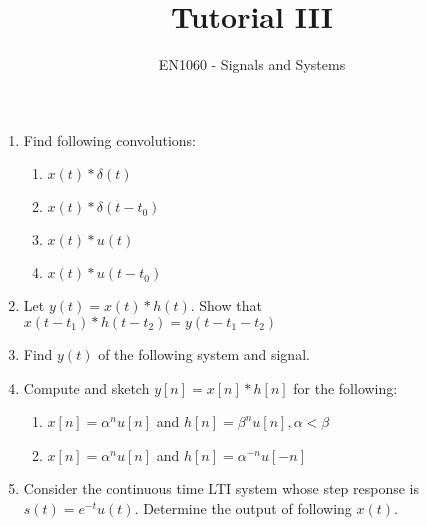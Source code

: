 \documentclass[12pt]{article}
\begin{document}


\title{Tutorial III}%
\author{EN1060 - Signals and Systems\\} %

\maketitle
\begin{enumerate}
\item Find following convolutions:
\begin{enumerate}
    \item $x(t)\ast\delta(t)$
    \item $x(t)\ast\delta(t-t_0)$
    \item $x(t)\ast u(t)$
    \item $x(t)\ast u(t-t_0)$
\end{enumerate}

\item Let $y(t) = x(t)\ast h(t)$. Show that $x(t-t_1)\ast h(t-t_2) = y(t-t_1-t_2)$

\item Find $y(t)$ of the following system and signal.

\begin{figure}[h]
    \centering
    
\caption{}
\end{figure}

\item Compute and sketch $y[n] = x[n]\ast h[n]$ for the following:

\begin{enumerate}
    \item $ x[n] = \alpha^{n}u[n]$ \hspace{1cm} and \hspace{1cm} $h[n] = \beta^{n}u[n] , \alpha < \beta$
    \item $x[n] = \alpha^{n}u[n]$  \hspace{1cm} and \hspace{1cm} $h[n] = \alpha^{-n}u[-n]$
\end{enumerate}

\item Consider the continuous time LTI system whose step response is $s(t) = e^{-t}u(t)$. Determine the output of following $x(t)$. 


\end{enumerate}
\end{document}
